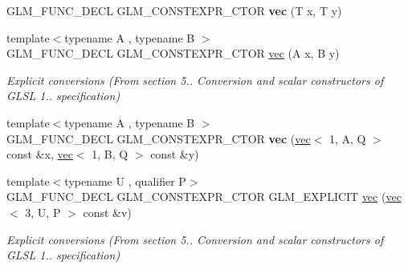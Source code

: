 \begin{DoxyCompactItemize}
G\+L\+M\+\_\+\+F\+U\+N\+C\+\_\+\+D\+E\+CL G\+L\+M\+\_\+\+C\+O\+N\+S\+T\+E\+X\+P\+R\+\_\+\+C\+T\+OR {\bfseries vec} (T x, T y)
\item 
\mbox{\label{structglm_1_1vec_3_012_00_01T_00_01Q_01_4_abea96c6b6d58c8388feaebb73af0cb68}} 
{\footnotesize template$<$typename A , typename B $>$ }\\G\+L\+M\+\_\+\+F\+U\+N\+C\+\_\+\+D\+E\+CL G\+L\+M\+\_\+\+C\+O\+N\+S\+T\+E\+X\+P\+R\+\_\+\+C\+T\+OR \hyperlink{structglm_1_1vec_3_012_00_01T_00_01Q_01_4_abea96c6b6d58c8388feaebb73af0cb68}{vec} (A x, B y)
\begin{DoxyCompactList}\small\item\em Explicit conversions (From section 5.. Conversion and scalar constructors of G\+L\+SL 1.. specification) \end{DoxyCompactList}\item 
\mbox{\label{structglm_1_1vec_3_012_00_01T_00_01Q_01_4_a72065648c117a667a7f06353b880a0aa}} 
{\footnotesize template$<$typename A , typename B $>$ }\\G\+L\+M\+\_\+\+F\+U\+N\+C\+\_\+\+D\+E\+CL G\+L\+M\+\_\+\+C\+O\+N\+S\+T\+E\+X\+P\+R\+\_\+\+C\+T\+OR {\bfseries vec} (\hyperlink{structglm_1_1vec}{vec}$<$ 1, A, Q $>$ const \&x, \hyperlink{structglm_1_1vec}{vec}$<$ 1, B, Q $>$ const \&y)
\item 
\mbox{\label{structglm_1_1vec_3_012_00_01T_00_01Q_01_4_a5b7cfdc305cd9c9cbedd6bdb8348e48c}} 
{\footnotesize template$<$typename U , qualifier P$>$ }\\G\+L\+M\+\_\+\+F\+U\+N\+C\+\_\+\+D\+E\+CL G\+L\+M\+\_\+\+C\+O\+N\+S\+T\+E\+X\+P\+R\+\_\+\+C\+T\+OR G\+L\+M\+\_\+\+E\+X\+P\+L\+I\+C\+IT \hyperlink{structglm_1_1vec_3_012_00_01T_00_01Q_01_4_a5b7cfdc305cd9c9cbedd6bdb8348e48c}{vec} (\hyperlink{structglm_1_1vec}{vec}$<$ 3, U, P $>$ const \&v)
\begin{DoxyCompactList}\small\item\em Explicit conversions (From section 5.. Conversion and scalar constructors of G\+L\+SL 1.. specification) \end{DoxyCompactList}\item 
\mbox{\label{structglm_1_1vec_3_012_00_01T_00_01Q_01_4_a2f77cbeba0c2efa024d10e348636c7c1}} 

\end{DoxyCompactItemize}
